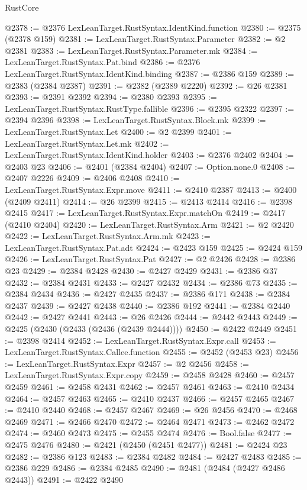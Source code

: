 \begin{lexlean}{RustCore}
\begin{coremodule}
@2378 := @2376 LexLeanTarget.RustSyntax.IdentKind.function
@2380 := @2375 (@2378 @159)
@2381 := LexLeanTarget.RustSyntax.Parameter
@2382 := @2 @2381
@2383 := LexLeanTarget.RustSyntax.Parameter.mk
@2384 := LexLeanTarget.RustSyntax.Pat.bind
@2386 := @2376 LexLeanTarget.RustSyntax.IdentKind.binding
@2387 := @2386 @159
@2389 := @2383 (@2384 @2387)
@2391 := @2382 (@2389 @2220)
@2392 := @26 @2381
@2393 := @2391 @2392
@2394 := @2380 @2393
@2395 := LexLeanTarget.RustSyntax.RustType.fallible
@2396 := @2395 @2322
@2397 := @2394 @2396
@2398 := LexLeanTarget.RustSyntax.Block.mk
@2399 := LexLeanTarget.RustSyntax.Let
@2400 := @2 @2399
@2401 := LexLeanTarget.RustSyntax.Let.mk
@2402 := LexLeanTarget.RustSyntax.IdentKind.holder
@2403 := @2376 @2402
@2404 := @2403 @23
@2406 := @2401 (@2384 @2404)
@2407 := Option.none.{0}
@2408 := @2407 @2226
@2409 := @2406 @2408
@2410 := LexLeanTarget.RustSyntax.Expr.move
@2411 := @2410 @2387
@2413 := @2400 (@2409 @2411)
@2414 := @26 @2399
@2415 := @2413 @2414
@2416 := @2398 @2415
@2417 := LexLeanTarget.RustSyntax.Expr.matchOn
@2419 := @2417 (@2410 @2404)
@2420 := LexLeanTarget.RustSyntax.Arm
@2421 := @2 @2420
@2422 := LexLeanTarget.RustSyntax.Arm.mk
@2423 := LexLeanTarget.RustSyntax.Pat.adt
@2424 := @2423 @159
@2425 := @2424 @159
@2426 := LexLeanTarget.RustSyntax.Pat
@2427 := @2 @2426
@2428 := @2386 @23
@2429 := @2384 @2428
@2430 := @2427 @2429
@2431 := @2386 @37
@2432 := @2384 @2431
@2433 := @2427 @2432
@2434 := @2386 @73
@2435 := @2384 @2434
@2436 := @2427 @2435
@2437 := @2386 @171
@2438 := @2384 @2437
@2439 := @2427 @2438
@2440 := @2386 @192
@2441 := @2384 @2440
@2442 := @2427 @2441
@2443 := @26 @2426
@2444 := @2442 @2443
@2449 := @2425 (@2430 (@2433 (@2436 (@2439 @2444))))
@2450 := @2422 @2449
@2451 := @2398 @2414
@2452 := LexLeanTarget.RustSyntax.Expr.call
@2453 := LexLeanTarget.RustSyntax.Callee.function
@2455 := @2452 (@2453 @23)
@2456 := LexLeanTarget.RustSyntax.Expr
@2457 := @2 @2456
@2458 := LexLeanTarget.RustSyntax.Expr.copy
@2459 := @2458 @2428
@2460 := @2457 @2459
@2461 := @2458 @2431
@2462 := @2457 @2461
@2463 := @2410 @2434
@2464 := @2457 @2463
@2465 := @2410 @2437
@2466 := @2457 @2465
@2467 := @2410 @2440
@2468 := @2457 @2467
@2469 := @26 @2456
@2470 := @2468 @2469
@2471 := @2466 @2470
@2472 := @2464 @2471
@2473 := @2462 @2472
@2474 := @2460 @2473
@2475 := @2455 @2474
@2476 := Bool.false
@2477 := @2475 @2476
@2480 := @2421 (@2450 (@2451 @2477))
@2481 := @2424 @23
@2482 := @2386 @123
@2483 := @2384 @2482
@2484 := @2427 @2483
@2485 := @2386 @229
@2486 := @2384 @2485
@2490 := @2481 (@2484 (@2427 @2486 @2443))
@2491 := @2422 @2490

\end{coremodule}
\end{lexlean}
